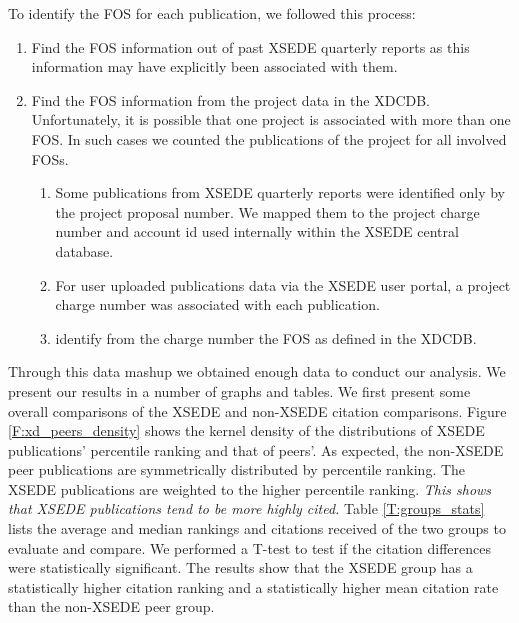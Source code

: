 \documentclass{sig-alternate}
\begin{document}
To identify the FOS for each publication, we followed this process:

\begin{enumerate}

\item Find the FOS information out of past XSEDE quarterly reports as this information may have explicitly been associated with them.

\item Find the FOS information from the project data in the XDCDB. Unfortunately, it is possible that one project is associated with more than one FOS. In such cases we counted the publications of the project for all involved FOSs.

\begin{enumerate}

\item Some publications from XSEDE quarterly reports were identified only by the project proposal number. We mapped them to the project charge number and account id used internally within the XSEDE central database.

\item For user uploaded publications data via the XSEDE user portal, a project charge number was associated with each publication.

\item identify from the charge number the FOS as defined in the XDCDB.

\end{enumerate}

\end{enumerate}

Through this data mashup we obtained enough data to conduct our analysis.
We present our results in a number of graphs and tables. We first present some overall comparisons of the XSEDE and non-XSEDE citation comparisons. Figure \ref{F:xd_peers_density} shows the kernel density of the distributions of XSEDE publications' percentile ranking and that of peers'.  As expected, the non-XSEDE peer publications are symmetrically distributed by percentile ranking.  The XSEDE publications are weighted to the higher percentile ranking. {\em This shows that XSEDE publications tend to be more highly cited.} Table \ref{T:groups_stats} lists the average and median rankings and citations received of the two groups to evaluate and compare. We performed a T-test to test if the citation differences were statistically significant. The results show that the XSEDE group has a statistically higher citation ranking and a statistically higher  mean citation rate than the non-XSEDE peer group.
\end{document}
